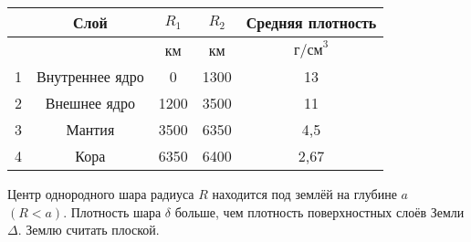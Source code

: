 \documentclass[11pt, a4paper,addpoints]{exam}
\theoremstyle{remark}
\begin{document}
\begin{questions}
\begin{table}[h]
            \centering
            \begin{tabular}{|c|c|c|c|c|}
                \hline
                & Слой & $R_1$ & $R_2$ & Средняя плотность \\\hline
                &  & км & км & $\text{г/см}^3$ \\\hline
                1 & Внутреннее ядро  & 0  & 1300  & 13 \\\hline
                2 & Внешнее ядро  & 1200  & 3500  & 11 \\\hline
                3 & Мантия  & 3500  & 6350  & 4,5 \\\hline
                4 & Кора & 6350  & 6400  & 2,67 \\\hline
            \end{tabular}
        \end{table}
        \question[3] Центр однородного шара радиуса $R$ находится под землёй на глубине $a$ $(R < a)$.
        Плотность шара $\delta$ больше, чем плотность поверхностных слоёв Земли $\Delta$. 
        Землю считать плоской.
\end{questions}
\end{document}
